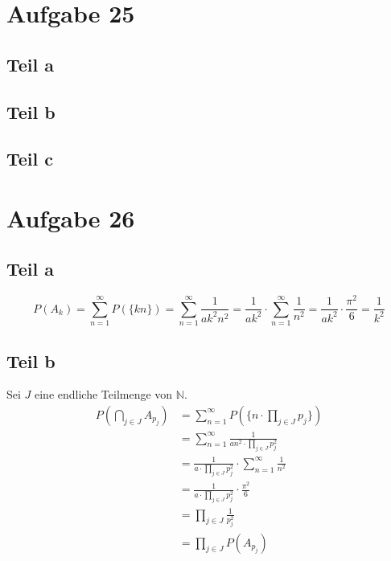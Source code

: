 \documentclass[10pt,a4paper]{article}
\begin{document}
\section{Aufgabe 25}

\subsection{Teil a}

\subsection{Teil b}

\subsection{Teil c}

\section{Aufgabe 26}

\subsection{Teil a}
\begin{equation}
  P(A_{k}) = \sum_{n = 1}^{\infty} P(\{kn\}) = \sum_{n = 1}^{\infty} \frac{1}{a k^{2} n^{2}} = \frac{1}{ak^{2}} \cdot \sum_{n = 1}^{\infty} \frac{1}{n^{2}} = \frac{1}{ak^{2}} \cdot \frac{\pi^{2}}{6} = \frac{1}{k^{2}}
\end{equation}

\subsection{Teil b}
Sei $J$ eine endliche Teilmenge von $\mathbb{N}$.
\begin{align*}
  P(\bigcap_{j \in J} A_{p_{j}}) & = \sum_{n = 1}^{\infty} P(\{ n \cdot \prod_{j \in J} p_{j} \})\\
  & = \sum_{n = 1}^{\infty} \frac{1}{an^{2} \cdot \prod_{j \in J} p_{j}^{2}}\\
  & = \frac{1}{a \cdot \prod_{j \in J} p_{j}^{2}} \cdot \sum_{n = 1}^{\infty} \frac{1}{n^{2}}\\
  & = \frac{1}{a \cdot \prod_{j \in J} p_{j}^{2}} \cdot \frac{\pi^{2}}{6}\\
  & = \prod_{j \in J} \frac{1}{p_{j}^{2}}\\
  & = \prod_{j \in J} P(A_{p_{j}})
\end{align*}
\end{document}
